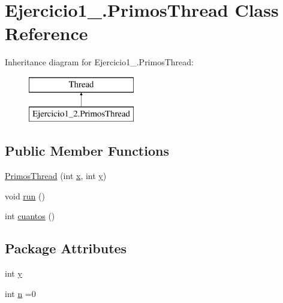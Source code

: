\hypertarget{class_ejercicio1__2_1_1_primos_thread}{}\section{Ejercicio1\+\_.\+Primos\+Thread Class Reference}
\label{class_ejercicio1__2_1_1_primos_thread}
Inheritance diagram for Ejercicio1\+\_.\+Primos\+Thread\+:\begin{figure}[H]
\begin{center}
\leavevmode
\includegraphics[height=2.000000cm]{class_ejercicio1__2_1_1_primos_thread}
\end{center}
\end{figure}
\subsection*{Public Member Functions}
\begin{DoxyCompactItemize}
\item 
\mbox{\hyperlink{class_ejercicio1__2_1_1_primos_thread_a9397e592ddc24ff533008df380619e20}{Primos\+Thread}} (int \mbox{\hyperlink{class_ejercicio1__2_1_1_primos_thread_a872cf888fbe168d9ca57e2b9ca075b61}{x}}, int \mbox{\hyperlink{class_ejercicio1__2_1_1_primos_thread_af052942d1162ca124373cee5f99c7dad}{y}})
\item 
void \mbox{\hyperlink{class_ejercicio1__2_1_1_primos_thread_ac7e117a957090bac9ba6d12bf3aca923}{run}} ()
\item 
int \mbox{\hyperlink{class_ejercicio1__2_1_1_primos_thread_ae54ebc3fd8ca99fbd744275f6dc6ca97}{cuantos}} ()
\end{DoxyCompactItemize}
\subsection*{Package Attributes}
\begin{DoxyCompactItemize}
\item 
int \mbox{\hyperlink{class_ejercicio1__2_1_1_primos_thread_af052942d1162ca124373cee5f99c7dad}{y}}
\item 
int \mbox{\hyperlink{class_ejercicio1__2_1_1_primos_thread_a72bf483238391becf2581e3722acd93a}{n}} =0
\end{DoxyCompactItemize}
